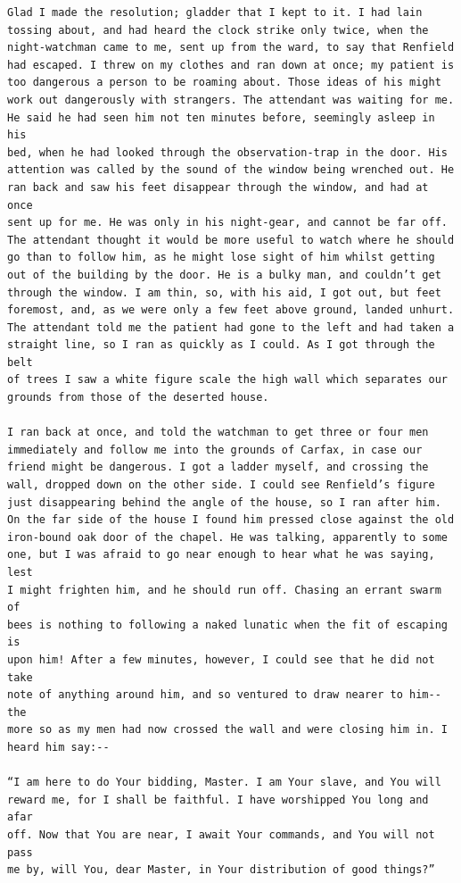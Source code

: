 \documentclass{article}
\begin{document}
\begin{verbatim}
Glad I made the resolution; gladder that I kept to it. I had lain
tossing about, and had heard the clock strike only twice, when the
night-watchman came to me, sent up from the ward, to say that Renfield
had escaped. I threw on my clothes and ran down at once; my patient is
too dangerous a person to be roaming about. Those ideas of his might
work out dangerously with strangers. The attendant was waiting for me.
He said he had seen him not ten minutes before, seemingly asleep in his
bed, when he had looked through the observation-trap in the door. His
attention was called by the sound of the window being wrenched out. He
ran back and saw his feet disappear through the window, and had at once
sent up for me. He was only in his night-gear, and cannot be far off.
The attendant thought it would be more useful to watch where he should
go than to follow him, as he might lose sight of him whilst getting
out of the building by the door. He is a bulky man, and couldn’t get
through the window. I am thin, so, with his aid, I got out, but feet
foremost, and, as we were only a few feet above ground, landed unhurt.
The attendant told me the patient had gone to the left and had taken a
straight line, so I ran as quickly as I could. As I got through the belt
of trees I saw a white figure scale the high wall which separates our
grounds from those of the deserted house.

I ran back at once, and told the watchman to get three or four men
immediately and follow me into the grounds of Carfax, in case our
friend might be dangerous. I got a ladder myself, and crossing the
wall, dropped down on the other side. I could see Renfield’s figure
just disappearing behind the angle of the house, so I ran after him.
On the far side of the house I found him pressed close against the old
iron-bound oak door of the chapel. He was talking, apparently to some
one, but I was afraid to go near enough to hear what he was saying, lest
I might frighten him, and he should run off. Chasing an errant swarm of
bees is nothing to following a naked lunatic when the fit of escaping is
upon him! After a few minutes, however, I could see that he did not take
note of anything around him, and so ventured to draw nearer to him--the
more so as my men had now crossed the wall and were closing him in. I
heard him say:--

“I am here to do Your bidding, Master. I am Your slave, and You will
reward me, for I shall be faithful. I have worshipped You long and afar
off. Now that You are near, I await Your commands, and You will not pass
me by, will You, dear Master, in Your distribution of good things?”


\end{verbatim}
\end{document}
